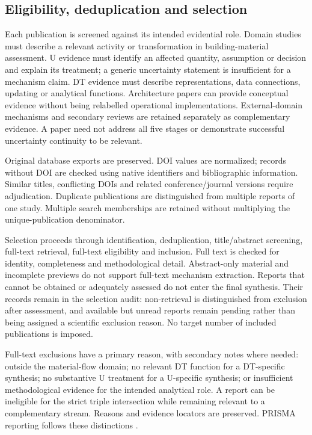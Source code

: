 \subsection{Eligibility, deduplication and selection}
Each publication is screened against its intended evidential role. Domain studies must describe a relevant activity or transformation in building-material assessment. U evidence must identify an affected quantity, assumption or decision and explain its treatment; a generic uncertainty statement is insufficient for a mechanism claim. DT evidence must describe representations, data connections, updating or analytical functions. Architecture papers can provide conceptual evidence without being relabelled operational implementations. External-domain mechanisms and secondary reviews are retained separately as complementary evidence. A paper need not address all five stages or demonstrate successful uncertainty continuity to be relevant.

Original database exports are preserved. DOI values are normalized; records without DOI are checked using native identifiers and bibliographic information. Similar titles, conflicting DOIs and related conference/journal versions require adjudication. Duplicate publications are distinguished from multiple reports of one study. Multiple search memberships are retained without multiplying the unique-publication denominator.

Selection proceeds through identification, deduplication, title/abstract screening, full-text retrieval, full-text eligibility and inclusion. Full text is checked for identity, completeness and methodological detail. Abstract-only material and incomplete previews do not support full-text mechanism extraction. Reports that cannot be obtained or adequately assessed do not enter the final synthesis. Their records remain in the selection audit: non-retrieval is distinguished from exclusion after assessment, and available but unread reports remain pending rather than being assigned a scientific exclusion reason. No target number of included publications is imposed.

Full-text exclusions have a primary reason, with secondary notes where needed: outside the material-flow domain; no relevant DT function for a DT-specific synthesis; no substantive U treatment for a U-specific synthesis; or insufficient methodological evidence for the intended analytical role. A report can be ineligible for the strict triple intersection while remaining relevant to a complementary stream. Reasons and evidence locators are preserved. PRISMA reporting follows these distinctions \citep{M01}.

